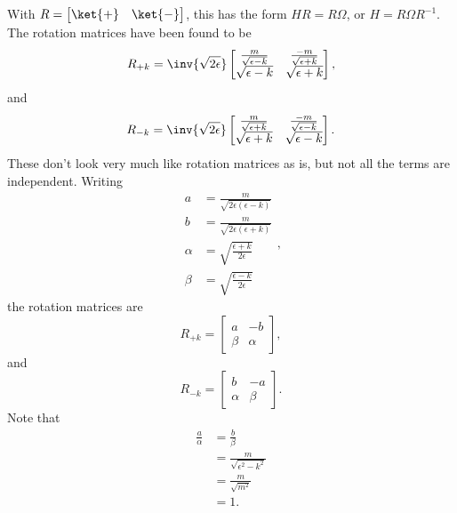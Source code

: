 With \( R = \begin{bmatrix} \ket{+} & \ket{-} \end{bmatrix} \), this has the form \( H R = R \Omega \), or \( H = R \Omega R^{-1} \).  The rotation matrices have been found to be
%
\begin{dmath}\label{eqn:gradQuantumProblemSet4Problem3:260}
R_{+k}
=
\inv{\sqrt{2\epsilon}}
\begin{bmatrix}
\frac{m}{\sqrt{\epsilon - k}} & \frac{-m}{\sqrt{\epsilon + k}} \\
\sqrt{\epsilon - k} & \sqrt{\epsilon + k}
\end{bmatrix},
\end{dmath}
%
and
\begin{dmath}\label{eqn:gradQuantumProblemSet4Problem3:280}
R_{-k}
=
\inv{\sqrt{2\epsilon}}
\begin{bmatrix}
\frac{m}{\sqrt{\epsilon + k}} & \frac{-m}{\sqrt{\epsilon - k}} \\
\sqrt{\epsilon + k} & \sqrt{\epsilon - k}
\end{bmatrix}.
\end{dmath}
%
These don't look very much like rotation matrices as is, but not all the terms are independent.  Writing
%
\begin{dmath}\label{eqn:gradQuantumProblemSet4Problem3:300}
\begin{aligned}
a &= \frac{m}{\sqrt{2\epsilon(\epsilon - k)}}  \\
b &= \frac{m}{\sqrt{2\epsilon(\epsilon + k)}} \\
\alpha &= \sqrt{\frac{\epsilon + k}{2 \epsilon}}  \\
\beta &= \sqrt{\frac{\epsilon - k}{2 \epsilon}}
\end{aligned},
\end{dmath}
%
the rotation matrices are
%
\begin{dmath}\label{eqn:gradQuantumProblemSet4Problem3:320}
R_{+k}
=
\begin{bmatrix}
a & - b \\
\beta & \alpha
\end{bmatrix},
\end{dmath}
%
and
\begin{dmath}\label{eqn:gradQuantumProblemSet4Problem3:340}
R_{-k}
=
\begin{bmatrix}
b & -a \\
\alpha & \beta
\end{bmatrix}.
\end{dmath}
%
Note that
\begin{equation}\label{eqn:gradQuantumProblemSet4Problem3:360}
\begin{aligned}
\frac{a}{\alpha} &= \frac{b}{\beta} \\
&= \frac{m}{\sqrt{\epsilon^2 - k^2}}  \\
&= \frac{m}{\sqrt{m^2}}  \\
&= 1.
\end{aligned}
\end{equation}
